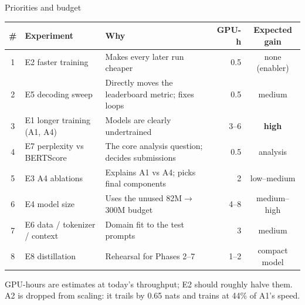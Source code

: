 \documentclass[aspectratio=169,11pt]{beamer}
\begin{document}
\begin{frame}{Priorities and budget}
  \small
  \centering
  \begin{tabularx}{\textwidth}{@{}clXrc@{}}
    \toprule
    \# & Experiment & Why & GPU-h & Expected gain\\
    \midrule
    1 & E2 faster training & Makes every later run cheaper & 0.5 & none (enabler)\\
    2 & E5 decoding sweep & Directly moves the leaderboard metric; fixes loops & 0.5 & medium\\
    3 & E1 longer training (A1, A4) & Models are clearly undertrained & 3--6 & \textbf{high}\\
    4 & E7 perplexity vs BERTScore & The core analysis question; decides submissions & 0.5 & analysis\\
    5 & E3 A4 ablations & Explains A1 vs A4; picks final components & 2 & low--medium\\
    6 & E4 model size & Uses the unused 82M$\to$300M budget & 4--8 & medium--high\\
    7 & E6 data / tokenizer / context & Domain fit to the test prompts & 3 & medium\\
    8 & E8 distillation & Rehearsal for Phases 2--7 & 1--2 & compact model\\
    \bottomrule
  \end{tabularx}

  \vspace{3mm}
  \raggedright
  GPU-hours are estimates at today's throughput; E2 should roughly halve them.
  A2 is dropped from scaling: it trails by 0.65 nats and trains at 44\% of A1's speed.
\end{frame}
\end{document}
